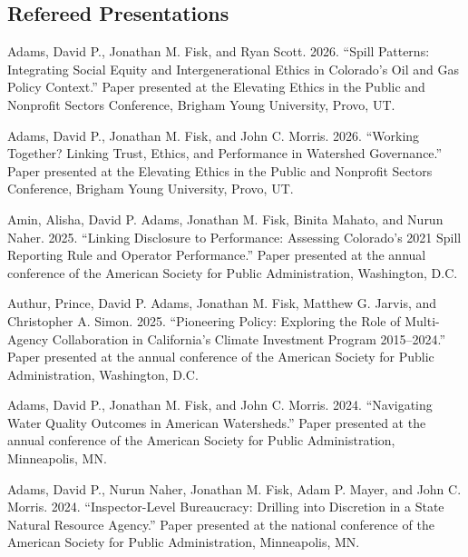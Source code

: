 \documentclass[11pt,letterpaper]{article}
\renewenvironment{itemize}{
  \begin{list}{}{
    \setlength{\leftmargin}{1.5em}
    \setlength{\itemsep}{0.25em}
    \setlength{\parskip}{0pt}
    \setlength{\parsep}{0.25em}
  }
}{
  \end{list}
}
\begin{document}
\subsection*{Refereed Presentations}
	\begin{itemize}\leftmargin=2pt\itemindent=-15pt\leftmargin=2pt\itemindent=-15pt
    
    \item Adams, David P., Jonathan M. Fisk, and Ryan Scott. 2026. ``Spill Patterns: Integrating Social Equity and Intergenerational Ethics in Colorado's Oil and Gas Policy Context.'' Paper presented at the Elevating Ethics in the Public and Nonprofit Sectors Conference, Brigham Young University, Provo, UT.

    \item Adams, David P., Jonathan M. Fisk, and John C. Morris. 2026. ``Working Together? Linking Trust, Ethics, and Performance in Watershed Governance.'' Paper presented at the Elevating Ethics in the Public and Nonprofit Sectors Conference, Brigham Young University, Provo, UT.

    \item Amin, Alisha, David P. Adams, Jonathan M. Fisk, Binita Mahato, and Nurun Naher. 2025. ``Linking Disclosure to Performance: Assessing Colorado's 2021 Spill Reporting Rule and Operator Performance.'' Paper presented at the annual conference of the American Society for Public Administration, Washington, D.C.

    \item Authur, Prince, David P. Adams, Jonathan M. Fisk, Matthew G. Jarvis, and Christopher A. Simon. 2025. ``Pioneering Policy: Exploring the Role of Multi-Agency Collaboration in California's Climate Investment Program 2015--2024.'' Paper presented at the annual conference of the American Society for Public Administration, Washington, D.C.
    
    \item Adams, David P., Jonathan M. Fisk, and John C. Morris. 2024. ``Navigating Water Quality Outcomes in American Watersheds.'' Paper presented at the annual conference of the American Society for Public Administration, Minneapolis, MN.
    
    \item Adams, David P., Nurun Naher, Jonathan M. Fisk, Adam P. Mayer, and John C. Morris. 2024. ``Inspector-Level Bureaucracy: Drilling into Discretion in a State Natural Resource Agency.'' Paper presented at the national conference of the American Society for Public Administration, Minneapolis, MN.
    

\end{itemize}
\end{document}
